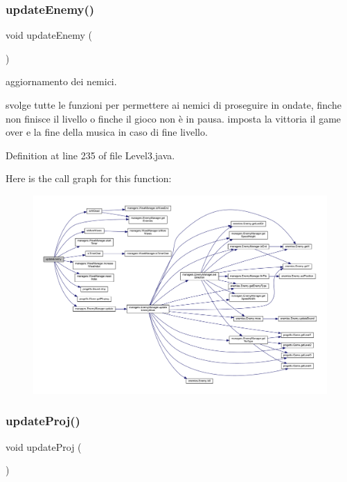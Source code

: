 \subsubsection{\texorpdfstring{update\+Enemy()}{updateEnemy()}}
{\footnotesize\ttfamily void update\+Enemy (\begin{DoxyParamCaption}{ }\end{DoxyParamCaption})}



aggiornamento dei nemici. 

svolge tutte le funzioni per permettere ai nemici di proseguire in ondate, finche non finisce il livello o finche il gioco non è in pausa. imposta la vittoria il game over e la fine della musica in caso di fine livello. 

Definition at line 235 of file Level3.\+java.

Here is the call graph for this function\+:\nopagebreak
\begin{figure}[H]
\begin{center}
\leavevmode
\includegraphics[width=350pt]{classscenes_1_1_level3_af005ec68c869a6acd5e833cba9330a50_cgraph}
\end{center}
\end{figure}
\mbox{\label{classscenes_1_1_level3_ac83c203b559f6fd0bb225744d7ccf854}} 
\subsubsection{\texorpdfstring{update\+Proj()}{updateProj()}}
{\footnotesize\ttfamily void update\+Proj (\begin{DoxyParamCaption}{ }\end{DoxyParamCaption})}



